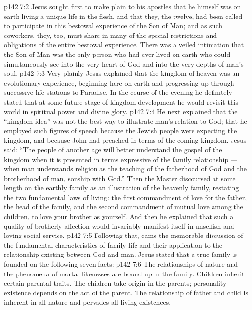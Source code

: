 \vs p142 7:2 Jesus sought first to make plain to his apostles that he himself was on earth living a unique life in the flesh, and that they, the twelve, had been called to participate in this bestowal experience of the Son of Man; and as such coworkers, they, too, must share in many of the special restrictions and obligations of the entire bestowal experience. There was a veiled intimation that the Son of Man was the only person who had ever lived on earth who could simultaneously see into the very heart of God and into the very depths of man’s soul.
\vs p142 7:3 Very plainly Jesus explained that the kingdom of heaven was an evolutionary experience, beginning here on earth and progressing up through successive life stations to Paradise. In the course of the evening he definitely stated that at some future stage of kingdom development he would revisit this world in spiritual power and divine glory.
\vs p142 7:4 He next explained that the “kingdom idea” was not the best way to illustrate man’s relation to God; that he employed such figures of speech because the Jewish people were expecting the kingdom, and because John had preached in terms of the coming kingdom. Jesus said: \textcolor{ubdarkred}{“The people of another age will better understand the gospel of the kingdom when it is presented in terms expressive of the family relationship --- when man understands religion as the teaching of the fatherhood of God and the brotherhood of man, sonship with God.”} Then the Master discoursed at some length on the earthly family as an illustration of the heavenly family, restating the two fundamental laws of living: the first commandment of love for the father, the head of the family, and the second commandment of mutual love among the children, to love your brother as yourself. And then he explained that such a quality of brotherly affection would invariably manifest itself in unselfish and loving social service.
\vs p142 7:5 Following that, came the memorable discussion of the fundamental characteristics of family life and their application to the relationship existing between God and man. Jesus stated that a true family is founded on the following seven facts:
\vs p142 7:6 \bibnobreakspace {} The relationships of nature and the phenomena of mortal likenesses are bound up in the family: Children inherit certain parental traits. The children take origin in the parents; personality existence depends on the act of the parent. The relationship of father and child is inherent in all nature and pervades all living existences.
